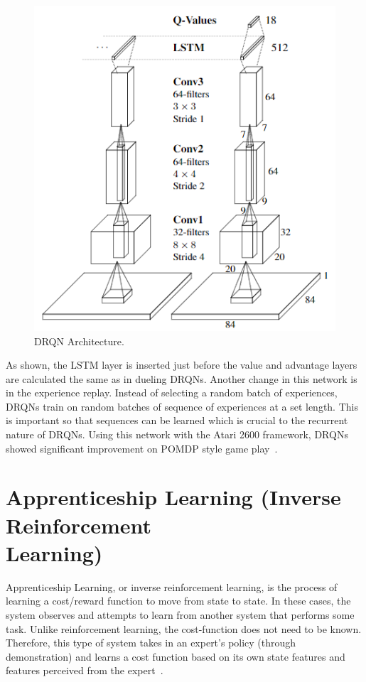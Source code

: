 \documentclass[12pt,american]{report}
\begin{document}
\begin{figure}
\centering
\includegraphics[scale=1]{images/drqn-arch.png}
\caption{DRQN Architecture.~\cite{HausknechtDRQN}}
\label{fig:drqn-arch}
\end{figure}

As shown, the LSTM layer is inserted just before the value and advantage layers are calculated the same as in dueling DRQNs. Another change in this network is in the experience replay.  Instead of selecting a random batch of experiences, DRQNs train on random batches of sequence of experiences at a set length.  This is important so that sequences can be learned which is crucial to the recurrent nature of DRQNs. Using this network with the Atari 2600 framework, DRQNs showed significant improvement on POMDP style game play~\cite{HausknechtDRQN}. 


\section{Apprenticeship Learning (Inverse Reinforcement \\ Learning)}
	Apprenticeship Learning, or inverse reinforcement learning, is the process of learning a cost/reward function to move from state to state. In these cases, the system observes and attempts to learn from another system that performs some task. Unlike reinforcement learning, the cost-function does not need to be known. Therefore, this type of system takes in an expert's policy (through demonstration) and learns a cost function based on its own state features and features perceived from the expert~\cite{jangir_2016}.		
		
\end{document}
